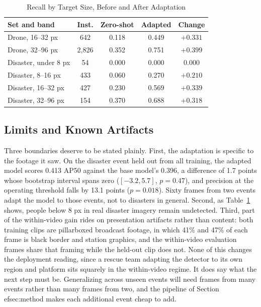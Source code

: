 \documentclass[conference,a4paper]{IEEEtran}
\begin{document}
\begin{table}[htbp]
\caption{Recall by Target Size, Before and After Adaptation}
\label{tab:persize}
\begin{center}
\begin{tabular}{|l|c|c|c|c|}
\hline
\textbf{Set and band} & \textbf{Inst.} & \textbf{Zero-shot} & \textbf{Adapted} & \textbf{Change} \\
\hline
Drone, 16--32 px & 642 & 0.118 & 0.449 & $+0.331$ \\
\hline
Drone, 32--96 px & 2,826 & 0.352 & 0.751 & $+0.399$ \\
\hline
Disaster, under 8 px & 54 & 0.000 & 0.000 & $0.000$ \\
\hline
Disaster, 8--16 px & 433 & 0.060 & 0.270 & $+0.210$ \\
\hline
Disaster, 16--32 px & 427 & 0.230 & 0.569 & $+0.339$ \\
\hline
Disaster, 32--96 px & 154 & 0.370 & 0.688 & $+0.318$ \\
\hline
\end{tabular}
\end{center}
\end{table}

\subsection{Limits and Known Artifacts}
\label{sec:limits}
Three boundaries deserve to be stated plainly. First, the adaptation is
specific to the footage it saw. On the disaster event held out from all
training, the adapted model scores 0.413 AP50 against the base model's 0.396, a
difference of 1.7 points whose bootstrap interval spans zero ($[-3.2, 5.7]$,
$p = 0.47$), and precision at the operating threshold falls by 13.1 points
($p = 0.018$). Sixty frames from two events adapt the model to those events,
not to disasters in general. Second, as Table~\ref{tab:persize} shows, people
below 8 px in real disaster imagery remain undetected. Third, part of the
within-video gain rides on presentation artifacts rather than content: both
training clips are pillarboxed broadcast footage, in which 41\% and 47\% of
each frame is black border and station graphics, and the within-video
evaluation frames share that framing while the held-out clip does not. None of
this changes the deployment reading, since a rescue team adapting the detector
to its own region and platform sits squarely in the within-video regime. It
does say what the next step must be. Generalizing across unseen events will
need frames from many events rather than many frames from two, and the pipeline
of Section~
ef{sec:method} makes each additional event cheap to add.
\end{document}
